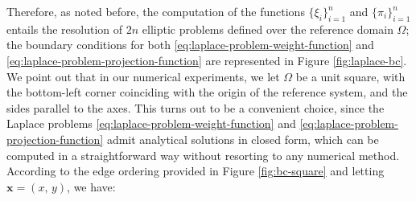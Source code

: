 \documentclass[12pt, a4paper, twoside, openright]{report}
\numberwithin{equation}{chapter}
\theoremstyle{theorem}
\theoremstyle{definition}
\theoremstyle{remark}
\theoremstyle{proposition}
\numberwithin{figure}{chapter}
\newcommand{\bg}[1]{\boldsymbol{#1}}
\begin{document}
		Therefore, as noted before, the computation of the functions $\big\lbrace \xi_i \big\rbrace_{i = 1}^n$ and $\big\lbrace \pi_i \big\rbrace_{i = 1}^n$ entails the resolution of $2n$ elliptic problems defined over the reference domain $\Omega$; the boundary conditions for both \eqref{eq:laplace-problem-weight-function} and \eqref{eq:laplace-problem-projection-function} are represented in Figure \ref{fig:laplace-bc}. We point out that in our numerical experiments, we let $\Omega$ be a unit square, with the bottom-left corner coinciding with the origin of the reference system, and the sides parallel to the axes. This turns out to be a convenient choice, since the Laplace problems \eqref{eq:laplace-problem-weight-function} and \eqref{eq:laplace-problem-projection-function} admit analytical solutions in closed form, which can be computed in a straightforward way without resorting to any numerical method. According to the edge ordering provided in Figure \ref{fig:bc-square} and letting $\bg{x} = (x, \, y)$, we have:
		
\end{document}
